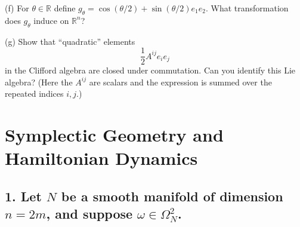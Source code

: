\begin{question}
(f) For $\theta \in \mathbb{R}$ define $g_\theta = \cos(\theta/2) + \sin(\theta/2) e_1 e_2$. What transformation does $g_\theta$ induce on $\mathbb{R}^n$?
\end{question}

\begin{question}
(g) Show that “quadratic” elements
\[
\frac{1}{2} A^{ij} e_i e_j
\]
in the Clifford algebra are closed under commutation. Can you identify this Lie algebra? (Here the $A^{ij}$ are scalars and the expression is summed over the repeated indices $i, j$.)
\end{question}

\section*{Symplectic Geometry and Hamiltonian Dynamics}

\subsection*{1. Let $N$ be a smooth manifold of dimension $n = 2m$, and suppose $\omega \in \Omega^2_N$.}


